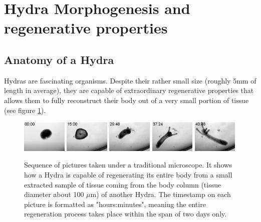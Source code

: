 
\section{Hydra Morphogenesis and regenerative properties}

\subsection{Anatomy of a Hydra}

Hydras are fascinating organisms. Despite their rather small size (roughly 5mm of length in average), they are capable of extraordinary regenerative properties that allows them to fully reconstruct their body out of a very small portion of tissue (see figure \ref{hydraregen}).
\begin{figure}
\label{hydraregen}
\includegraphics[width=0.19\textwidth]{figures/hydra_growth1}
\includegraphics[width=0.19\textwidth]{figures/hydra_growth2}
\includegraphics[width=0.19\textwidth]{figures/hydra_growth3}	\includegraphics[width=0.19\textwidth]{figures/hydra_growth4}
\includegraphics[width=0.19\textwidth]{figures/hydra_growth5}
\caption{Sequence of pictures taken under a traditional microscope. It shows how a Hydra is capable of regenerating its entire body from a small extracted sample of tissue coming from the body column (tissue diameter about 100 $\mu$m) of another Hydra. The timestamp on each picture is formatted as "hours:minutes", meaning the entire regeneration process takes place within the span of two days only.}
\end{figure}

